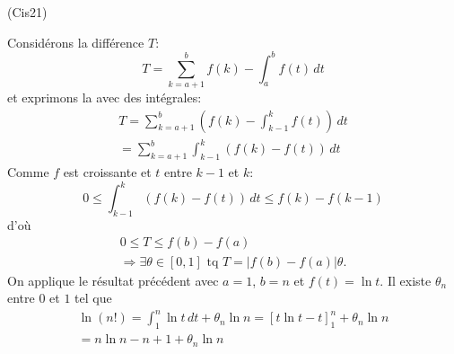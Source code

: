 \begin{tiny}(Cis21)\end{tiny} Considérons la différence $T$:
\begin{displaymath}
 T = \sum_{k=a+1}^bf(k) - \int_a^bf(t)\,dt
\end{displaymath}
et exprimons la avec des intégrales:
\begin{multline*}
 T = \sum_{k=a+1}^b\left( f(k)-\int_{k-1}^kf(t)\right) \,dt\\
= \sum_{k=a+1}^b \int_{k-1}^k \left( f(k) - f(t)\right) \,dt
\end{multline*}
Comme $f$ est croissante et $t$ entre $k-1$ et $k$:
\begin{displaymath}
 0\leq \int_{k-1}^k \left( f(k) - f(t)\right) \,dt
\leq f(k)-f(k-1)
\end{displaymath}
d'où
\begin{multline*}
 0\leq T\leq f(b)-f(a)\\
 \Rightarrow \exists \theta \in \left[0,1 \right] \text{ tq }
 T = \left|f(b) - f(a)\right| \theta. 
\end{multline*}
On applique le résultat précédent avec $a=1$, $b=n$ et $f(t)=\ln t$. Il existe $\theta_n$ entre $0$ et $1$ tel que
\begin{multline*}
 \ln(n!)=\int_1^n\ln t\,dt + \theta_n \ln n
=\left[t\ln t-t \right]_1^n + \theta_n \ln n \\
= n\ln n -n +1 + \theta_n \ln n
\end{multline*}
